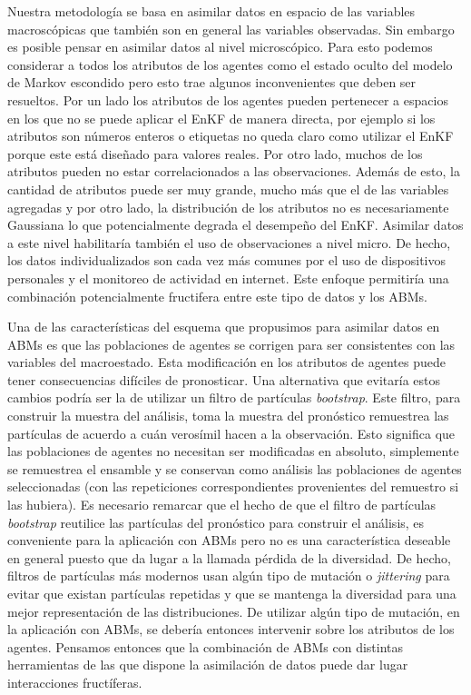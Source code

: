 Nuestra metodología se basa en asimilar datos en espacio de las variables macroscópicas que también son en general las variables observadas. Sin embargo es posible pensar en asimilar datos al nivel microscópico. Para esto podemos considerar a todos los atributos de los agentes como el estado oculto del modelo de Markov escondido pero esto trae algunos inconvenientes que deben ser resueltos. Por un lado los atributos de los agentes pueden pertenecer a espacios en los que no se puede aplicar el EnKF de manera directa, por ejemplo si los atributos son números enteros o etiquetas no queda claro como utilizar el EnKF porque este está diseñado para valores reales. Por otro lado, muchos de los atributos pueden no estar correlacionados a las observaciones. Además de esto, la cantidad de atributos puede ser muy grande, mucho más que el de las variables agregadas y por otro lado, la distribución de los atributos no es necesariamente Gaussiana lo que potencialmente degrada el desempeño del EnKF. Asimilar datos a este nivel habilitaría también el uso de observaciones a nivel micro. De hecho, los datos individualizados son cada vez más comunes por el uso de dispositivos personales y el monitoreo de actividad en internet. Este enfoque permitiría una combinación potencialmente fructifera entre este tipo de datos y los ABMs. 

Una de las características del esquema que propusimos para asimilar datos en ABMs es que las poblaciones de agentes se corrigen para ser consistentes con las variables del macroestado. Esta modificación en los atributos de agentes puede tener consecuencias difíciles de pronosticar. Una alternativa que evitaría estos cambios podría ser la de utilizar un filtro de partículas \textit{bootstrap}. Este filtro, para construir la muestra del análisis, toma la muestra del pronóstico remuestrea las partículas de acuerdo a cuán verosímil hacen a la observación. Esto significa que las poblaciones de agentes no necesitan ser modificadas en absoluto, simplemente se remuestrea el ensamble y se conservan como análisis las poblaciones de agentes seleccionadas (con las repeticiones correspondientes provenientes del remuestro si las hubiera). Es necesario remarcar que el hecho de que el filtro de partículas \textit{bootstrap} reutilice las partículas del pronóstico para construir el análisis, es conveniente para la aplicación con ABMs pero no es una característica deseable en general puesto que da lugar a la llamada pérdida de la diversidad. De hecho, filtros de partículas más modernos usan algún tipo de mutación o \textit{jittering} para evitar que existan partículas repetidas y que se mantenga la diversidad para una mejor representación de las distribuciones. De utilizar algún tipo de mutación, en la aplicación con ABMs, se debería entonces intervenir sobre los atributos de los agentes. Pensamos entonces que la combinación de ABMs con distintas herramientas de las que dispone la asimilación de datos puede dar lugar interacciones fructíferas.

